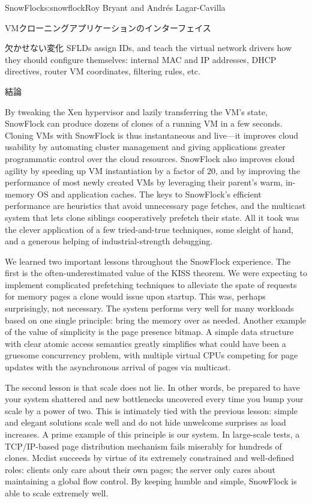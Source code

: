 \begin{aosachapter}{SnowFlock}{s:snowflock}{Roy Bryant and Andr\'e{s} Lagar-Cavilla}
\begin{aosasect1}{VMクローニングアプリケーションのインターフェイス}
\begin{aosasect2}{欠かせない変化}
SFLDs assign IDs, and teach the virtual network drivers how they
should configure themselves: internal MAC and IP addresses, DHCP
directives, router VM coordinates, filtering rules, etc.

\end{aosasect2}

\end{aosasect1}

\begin{aosasect1}{結論}

By tweaking the Xen hypervisor and lazily transferring the VM's state,
SnowFlock can produce dozens of clones of a running VM in a few
seconds. Cloning VMs with SnowFlock is thus instantaneous and
live---it improves cloud usability by automating cluster management
and giving applications greater programmatic control over the cloud
resources. SnowFlock also improves cloud agility by speeding up VM
instantiation by a factor of 20, and by improving the performance of
most newly created VMs by leveraging their parent's warm, in-memory OS
and application caches. The keys to SnowFlock's efficient performance
are heuristics that avoid unnecessary page fetches, and the multicast
system that lets clone siblings cooperatively prefetch their
state. All it took was the clever application of a few tried-and-true
techniques, some sleight of hand, and a generous helping of
industrial-strength debugging.

We learned two important lessons throughout the SnowFlock experience.
The first is the often-underestimated value of the KISS theorem. We
were expecting to implement complicated prefetching techniques to
alleviate the spate of requests for memory pages a clone would issue
upon startup.  This was, perhaps surprisingly, not necessary. The
system performs very well for many workloads based on one single
principle: bring the memory over as needed.  Another example of the
value of simplicity is the page presence bitmap. A simple data
structure with clear atomic access semantics greatly simplifies what
could have been a gruesome concurrency problem, with multiple virtual
CPUs competing for page updates with the asynchronous arrival of pages
via multicast.

The second lesson is that scale does not lie. In other words, be
prepared to have your system shattered and new bottlenecks uncovered
every time you bump your scale by a power of two. This is intimately
tied with the previous lesson: simple and elegant solutions scale well
and do not hide unwelcome surprises as load increases. A prime example
of this principle is our  system. In large-scale tests, a
TCP/IP-based page distribution mechanism fails miserably for hundreds
of clones. Mcdist succeeds by virtue of its extremely constrained and
well-defined roles: clients only care about their own pages; the
server only cares about maintaining a global flow control. By keeping
 humble and simple, SnowFlock is able to scale extremely well.


\end{aosasect1}
\end{aosachapter}
